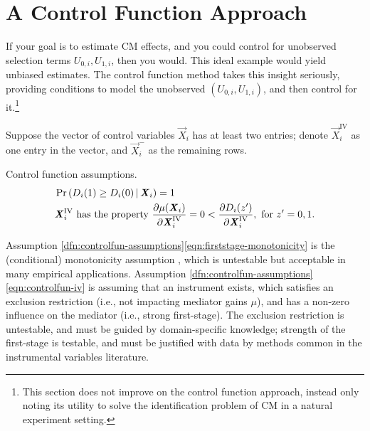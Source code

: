 \section{A Control Function Approach}
\label{sec:controlfun}
If your goal is to estimate CM effects, and you could control for unobserved selection terms $U_{0,i}, U_{1,i}$, then you would.
This ideal example would yield unbiased estimates.
The control function method takes this insight seriously, providing conditions to model the unobserved $\left(U_{0,i}, U_{1,i}\right)$, and then control for it.\footnote{
    This section does not improve on the control function approach, instead only noting its utility to solve the identification problem of CM in a natural experiment setting.
}

Suppose the vector of control variables $\vec X_i$ has at least two entries;
denote $\vec X_i^{\text{IV}}$ as one entry in the vector, and $\vec X_i^-$ as the remaining rows.
\begin{definition}
    \label{dfn:controlfun-assumptions}
    Control function assumptions.
    \begin{align}
        \label{eqn:firststage-monotonicity}
        &\Probgiven{ D_i(1) \geq D_i(0) }{\vec X_i} = 1    \\
        \label{eqn:controlfun-iv}
        &\vec X_i^{\text{IV}} \text{ has the property }
        \partialdiff[\mu(\vec X_i)]{\vec X_i^{\text{IV}}} = 0 < \partialdiff[D_i(z')]{\vec X_i^{\text{IV}}}, \textnormal{ for } z' = 0, 1.
    \end{align}
\end{definition}
Assumption \ref{dfn:controlfun-assumptions}\eqref{eqn:firststage-monotonicity} is the (conditional) monotonicity assumption \citep{imbens1994identification}, which is untestable but acceptable in many empirical applications.
Assumption \ref{dfn:controlfun-assumptions}\eqref{eqn:controlfun-iv} is assuming that an instrument exists, which satisfies an exclusion restriction (i.e., not impacting mediator gains $\mu$), and has a non-zero influence on the mediator (i.e., strong first-stage).
The exclusion restriction is untestable, and must be guided by domain-specific knowledge; strength of the first-stage is testable, and must be justified with data by methods common in the instrumental variables literature.

